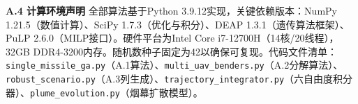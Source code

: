 \documentclass{JXUSTmodeling}
\begin{document}
\begin{appendixx}
\textbf{A.4 计算环境声明}
全部算法基于Python 3.9.12实现，关键依赖版本：NumPy 1.21.5（数值计算）、SciPy 1.7.3（优化与积分）、DEAP 1.3.1（遗传算法框架）、PuLP 2.6.0（MILP接口）。硬件平台为Intel Core i7-12700H（14核/20线程），32GB DDR4-3200内存。随机数种子固定为42以确保可复现。代码文件清单：\texttt{single\_missile\_ga.py}（A.1算法）、\texttt{multi\_uav\_benders.py}（A.2分解算法）、\texttt{robust\_scenario.py}（A.3列生成）、\texttt{trajectory\_integrator.py}（六自由度积分器）、\texttt{plume\_evolution.py}（烟幕扩散模型）。
\end{appendixx}
\end{document}
